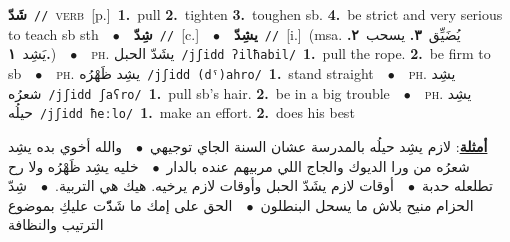 \documentclass[10pt,a4paper,twoside]{article} %
\begin{document}
\begin{multicols}{2}
{\setlength\topsep{0pt}\textbf{\foreignlanguage{arabic}{شَدّ}}\ {\color{gray}\texttt{//}\color{black}}\ \textsc{verb}\ [p.]\ \textbf{1.}~pull  \textbf{2.}~tighten  \textbf{3.}~toughen sb.  \textbf{4.}~be strict and very serious to teach sb sth\ \ $\bullet$\ \ \setlength\topsep{0pt}\textbf{\foreignlanguage{arabic}{شِدّ}}\ {\color{gray}\texttt{//}\color{black}}\ [c.]\ \ $\bullet$\ \ \setlength\topsep{0pt}\textbf{\foreignlanguage{arabic}{يشِدّ}}\ {\color{gray}\texttt{//}\color{black}}\ [i.]\ \color{gray}(msa. \foreignlanguage{arabic}{يُضَيِّق}~\foreignlanguage{arabic}{\textbf{٣.}}  \foreignlanguage{arabic}{يسحب}~\foreignlanguage{arabic}{\textbf{٢.}}  \foreignlanguage{arabic}{يَشِد}~\foreignlanguage{arabic}{\textbf{١.}})\color{black}\ \ $\bullet$\ \ \textsc{ph.} \color{gray} \foreignlanguage{arabic}{يشَدّ الحبل}\color{black}\ {\color{gray}\texttt{/{\sffamily jʃidd ʔilħabil}/}\color{black}}\ \textbf{1.}~pull the rope.  \textbf{2.}~be firm to sb\ \ $\bullet$\ \ \textsc{ph.} \color{gray} \foreignlanguage{arabic}{يشِد ظَهْرُه}\color{black}\ {\color{gray}\texttt{/{\sffamily jʃidd (dˤ)ahro}/}\color{black}}\ \textbf{1.}~stand straight\ \ $\bullet$\ \ \textsc{ph.} \color{gray} \foreignlanguage{arabic}{يشِد شعرُه}\color{black}\ {\color{gray}\texttt{/{\sffamily jʃidd ʃaʕro}/}\color{black}}\ \textbf{1.}~pull sb's hair.  \textbf{2.}~be in a big trouble\ \ $\bullet$\ \ \textsc{ph.} \color{gray} \foreignlanguage{arabic}{يشِد حيلُه}\color{black}\ {\color{gray}\texttt{/{\sffamily jʃidd ħeːlo}/}\color{black}}\ \textbf{1.}~make an effort.  \textbf{2.}~does his best\  \begin{flushright}\color{gray}\foreignlanguage{arabic}{\textbf{\underline{\foreignlanguage{arabic}{أمثلة}}}: لازم يشِد حيلُه بالمدرسة عشان السنة الجاي توجيهي\ $\bullet$\ \  والله أخوي بده يشِد شعرُه من ورا الديوك والجاج اللي مربيهم عنده بالدار\ $\bullet$\ \  خليه يشِد ظَهْرُه ولا رح تطلعله حدبة\ $\bullet$\ \  أوقات لازم يشَدّ الحبل وأوقات لازم يرخيه. هيك هي التربية.\ $\bullet$\ \  شِدّ الحزام منيح بلاش ما يسحل البنطلون\ $\bullet$\ \  الحق على إمك ما شَدّّت عليكِ بموضوع الترتيب والنظافة}\end{flushright}\color{black}} \vspace{2mm}


\end{multicols}
\end{document}

